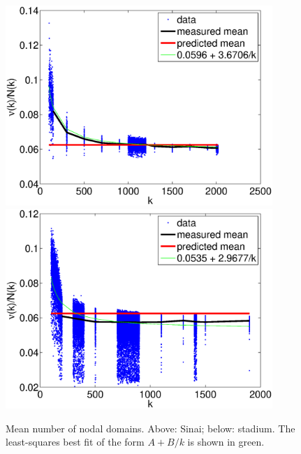 \documentclass{report}
\begin{document}
\begin{figure}
  \begin{center}
    \includegraphics[width=0.9\textwidth]{figs/results/qugrs_all_mean.eps}
    \includegraphics[width=0.9\textwidth]{figs/results/qust_all_mean.eps}
    \caption{Mean number of nodal domains. Above: Sinai; below: stadium. The least-squares best fit of the form $A + B/k$ is shown in green.}
    \label{fig:mean}
  \end{center}
\end{figure}
\end{document}
